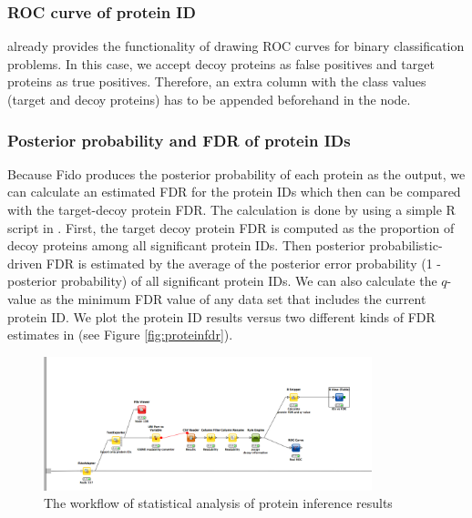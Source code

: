 \subsubsection{ROC curve of protein ID}

 already provides the functionality of drawing ROC curves for binary classification problems. In this case, we accept decoy proteins as false positives and target proteins as true positives. Therefore, an extra column with the class values (target and decoy proteins) has to be appended beforehand in the  node. 

\subsubsection{Posterior probability and FDR of protein IDs}
Because Fido produces the posterior probability of each protein as the output, we can calculate an estimated FDR for the protein IDs which then can be compared with the target-decoy protein FDR. The calculation is done by using a simple R script in . 
First, the target decoy protein FDR is computed as the proportion of decoy proteins among all significant protein IDs. Then posterior probabilistic-driven FDR is estimated by the average of the posterior error probability (1 - posterior probability) of all significant protein IDs. We can also calculate the $q$-value as the minimum FDR value of any data set that includes the current protein ID. 
We plot the protein ID results versus two different kinds of FDR estimates in  (see Figure \ref{fig:proteinfdr}).


\begin{figure}[htbp]
  \centering
  \includegraphics[width=0.85\textwidth]{graphics/protein_inference/ProteinInferenceKNIME_workflow.pdf}
  \caption{The workflow of statistical analysis of protein inference results}
  \label{fig:proteininference}
\end{figure}

